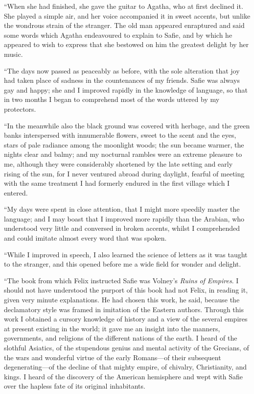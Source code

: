 \documentclass[12pt,openright]{book}
\begin{document}
“When she had finished, she gave the guitar to Agatha, who at first declined it. She played a simple air, and her voice accompanied it in sweet accents, but unlike the wondrous strain of the stranger. The old man appeared enraptured and said some words which Agatha endeavoured to explain to Safie, and by which he appeared to wish to express that she bestowed on him the greatest delight by her music.

“The days now passed as peaceably as before, with the sole alteration that joy had taken place of sadness in the countenances of my friends. Safie was always gay and happy; she and I improved rapidly in the knowledge of language, so that in two months I began to comprehend most of the words uttered by my protectors.

“In the meanwhile also the black ground was covered with herbage, and the green banks interspersed with innumerable flowers, sweet to the scent and the eyes, stars of pale radiance among the moonlight woods; the sun became warmer, the nights clear and balmy; and my nocturnal rambles were an extreme pleasure to me, although they were considerably shortened by the late setting and early rising of the sun, for I never ventured abroad during daylight, fearful of meeting with the same treatment I had formerly endured in the first village which I entered.

“My days were spent in close attention, that I might more speedily master the language; and I may boast that I improved more rapidly than the Arabian, who understood very little and conversed in broken accents, whilst I comprehended and could imitate almost every word that was spoken.

“While I improved in speech, I also learned the science of letters as it was taught to the stranger, and this opened before me a wide field for wonder and delight.

“The book from which Felix instructed Safie was Volney’s \textit{Ruins}\textit{ }\textit{of Empires}. I should not have understood the purport of this book had not Felix, in reading it, given very minute explanations. He had chosen this work, he said, because the declamatory style was framed in imitation of the Eastern authors. Through this work I obtained a cursory knowledge of history and a view of the several empires at present existing in the world; it gave me an insight into the manners, governments, and religions of the different nations of the earth. I heard of the slothful Asiatics, of the stupendous genius and mental activity of the Grecians, of the wars and wonderful virtue of the early Romans—of their subsequent degenerating—of the decline of that mighty empire, of chivalry, Christianity, and kings. I heard of the discovery of the American hemisphere and wept with Safie over the hapless fate of its original inhabitants.
\end{document}
